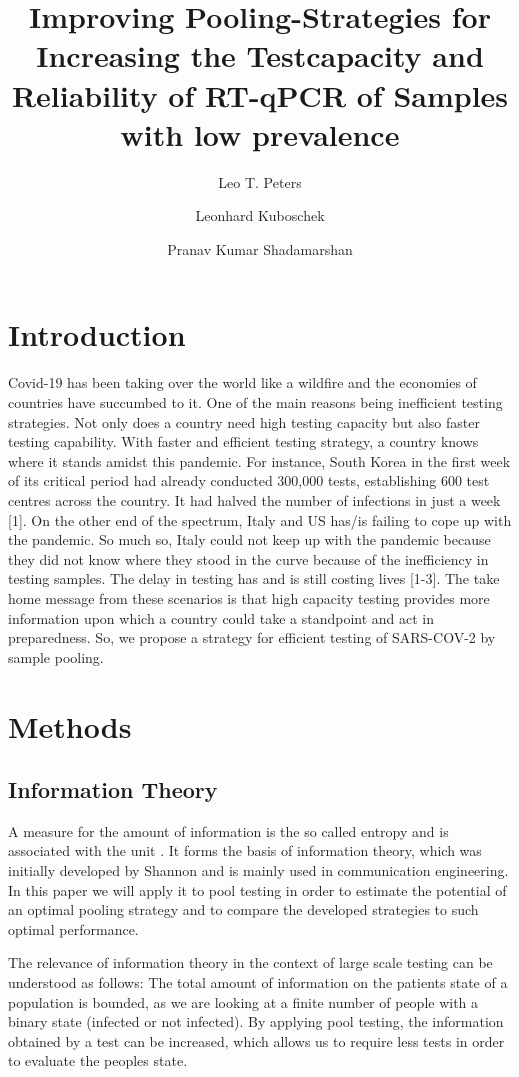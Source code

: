 \documentclass[fleqn,10pt]{wlscirep}
\title{Improving Pooling-Strategies for Increasing the Testcapacity and Reliability of RT-qPCR of Samples with low prevalence} %
\author[1,*]{Leo T. Peters}
\author[2]{Leonhard Kuboschek}
\author[2]{Pranav Kumar Shadamarshan}
\begin{document}
\flushbottom
\maketitle

\thispagestyle{empty}

\section{Introduction}
Covid-19 has been taking over the world like a wildfire and the economies of
countries have succumbed to it. One of the main reasons being inefficient
testing strategies. Not only does a country need high testing capacity but also
faster testing capability. With faster and efficient testing strategy, a country
knows where it stands amidst this pandemic. For instance, South Korea in
the first week of its critical period had already conducted 300,000 tests,
establishing 600 test centres across the country. It had halved the number of
infections in just a week [1]. On the other end of the spectrum, Italy and US
has/is failing to cope up with the pandemic. So much so, Italy could not keep
up with the pandemic because they did not know where they stood in the
curve because of the inefficiency in testing samples. The delay in testing has
and is still costing lives [1-3]. The take home message from these scenarios is
that high capacity testing provides more information upon which a country
could take a standpoint and act in preparedness. So, we propose a strategy for
efficient testing of SARS-COV-2 by sample pooling.


\section{Methods}

\subsection{Information Theory}
A measure for the amount of information is the so called \glqq entropy\grqq{} and is associated with the unit \si{\Bit}. It forms the basis of information theory, which was initially developed by Shannon \cite{Shannon} and is mainly used in communication engineering. In this paper we will apply it to pool testing in order to estimate the potential of an optimal pooling strategy and to compare the developed strategies to such optimal performance. 

The relevance of information theory in the context of large scale testing can be understood as follows: The total amount of information on the patients state of a population is bounded, as we are looking at a finite number of people with a binary state (infected or not infected). By applying pool testing, the information obtained by a test can be increased, which allows us to require less tests in order to evaluate the peoples state.
\end{document}
